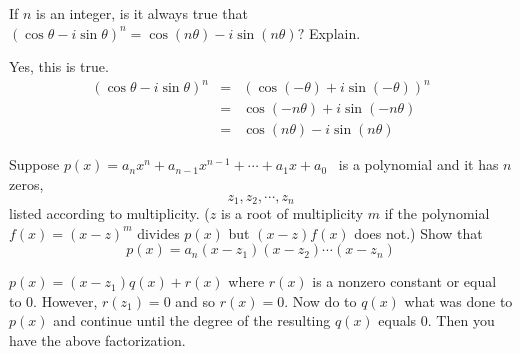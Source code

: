 \begin{enumialphparenastyle}
\begin{ex} If $n$ is an integer, is it always true that $\left( \cos \theta
-i\sin \theta \right) ^{n}=\cos \left( n\theta \right) -i\sin \left( n\theta
\right) ?$ Explain.
\begin{sol}
Yes, this is true.
\begin{eqnarray*}
\left( \cos \theta -i\sin \theta \right) ^{n} &=&\left( \cos \left( -\theta
\right) +i\sin \left( -\theta \right) \right) ^{n} \\
&=&\cos \left( -n\theta \right) +i\sin \left( -n\theta \right) \\
&=&\cos \left( n\theta \right) -i\sin \left( n\theta \right)
\end{eqnarray*}
\end{sol}
\end{ex}


\begin{ex} Suppose $p\left( x\right) =a_{n}x^{n}+a_{n-1}x^{n-1}+\cdots
+a_{1}x+a_{0}$ \ is a polynomial and it has $n$ zeros,
\begin{equation*}
z_{1},z_{2},\cdots ,z_{n}
\end{equation*}
listed according to multiplicity. ($z$ is a root of multiplicity $m$ if the
polynomial $f\left( x\right) =\left( x-z\right) ^{m}$ divides $p\left(
x\right) $ but $\left( x-z\right) f\left( x\right) $ does not.) Show that
\begin{equation*}
p\left( x\right) =a_{n}\left( x-z_{1}\right) \left( x-z_{2}\right) \cdots
\left( x-z_{n}\right) 
\end{equation*} 
\begin{sol}
$p\left( x\right) =\left( x-z_{1}\right) q\left( x\right) +r\left( x\right) $
where $r\left( x\right) $ is a nonzero constant or equal to $0$. However, $r\left( z_{1}\right) =0$ and so $r\left( x\right) =0$. Now do to $q\left(
x\right) $ what was done to $p\left( x\right) $ and continue until the
degree of the resulting $q\left( x\right) $ equals $0$. Then you have the
above factorization.
\end{sol}
\end{ex}

\end{enumialphparenastyle}